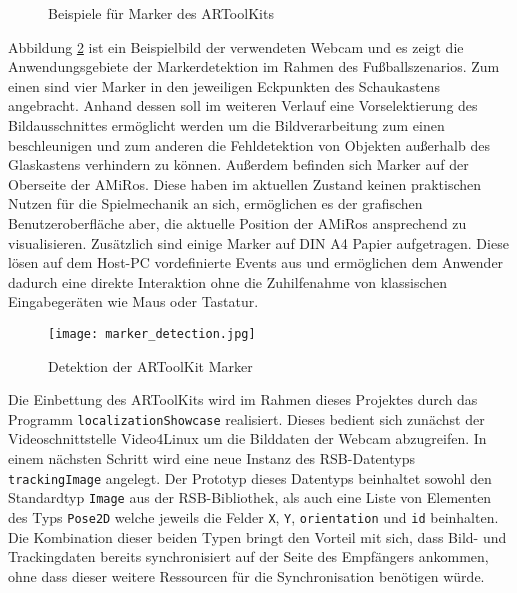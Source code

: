 \begin{figure}
	\begin{center}
		\caption{Beispiele für Marker des ARToolKits}
		\label{fig:art_marker}
	\end{center}
\end{figure}

Abbildung \ref{fig:marker_detection} ist ein Beispielbild der verwendeten Webcam und es zeigt die Anwendungsgebiete der Markerdetektion im Rahmen des Fußballszenarios. Zum einen sind vier Marker in den jeweiligen Eckpunkten des Schaukastens angebracht. Anhand dessen soll im weiteren Verlauf eine Vorselektierung des Bildausschnittes ermöglicht werden um die Bildverarbeitung zum einen beschleunigen und zum anderen die Fehldetektion von Objekten außerhalb des Glaskastens verhindern zu können. Außerdem befinden sich Marker auf der Oberseite der AMiRos. Diese haben im aktuellen Zustand keinen praktischen Nutzen für die Spielmechanik an sich, ermöglichen es der grafischen Benutzeroberfläche aber, die aktuelle Position der AMiRos ansprechend zu visualisieren. Zusätzlich sind einige Marker auf DIN A4 Papier aufgetragen. Diese lösen auf dem Host-PC vordefinierte Events aus und ermöglichen dem Anwender dadurch eine direkte Interaktion ohne die Zuhilfenahme von klassischen Eingabegeräten wie Maus oder Tastatur.

\begin{figure}
	\begin{center}
		\texttt{[image: marker\_detection.jpg]} 	
		\caption{Detektion der ARToolKit Marker}
		\label{fig:marker_detection}
	\end{center}
\end{figure}

Die Einbettung des ARToolKits wird im Rahmen dieses Projektes durch das Programm \texttt{localizationShowcase} realisiert. Dieses bedient sich zunächst der Videoschnitt\-stelle Video4Linux um die Bilddaten der Webcam abzugreifen. In einem nächsten Schritt wird eine neue Instanz des RSB-Datentyps \texttt{trackingImage} angelegt. Der Prototyp dieses Datentyps beinhaltet sowohl den Standardtyp \texttt{Image} aus der RSB-Bibliothek, als auch eine Liste von Elementen des Typs \texttt{Pose2D} welche jeweils die Felder \texttt{X}, \texttt{Y}, \texttt{orientation} und \texttt{id} beinhalten. Die Kombination dieser beiden Typen bringt den Vorteil mit sich, dass Bild- und Trackingdaten bereits synchronisiert auf der Seite des Empfängers ankommen, ohne dass dieser weitere Ressourcen für die Synchronisation benötigen würde.


